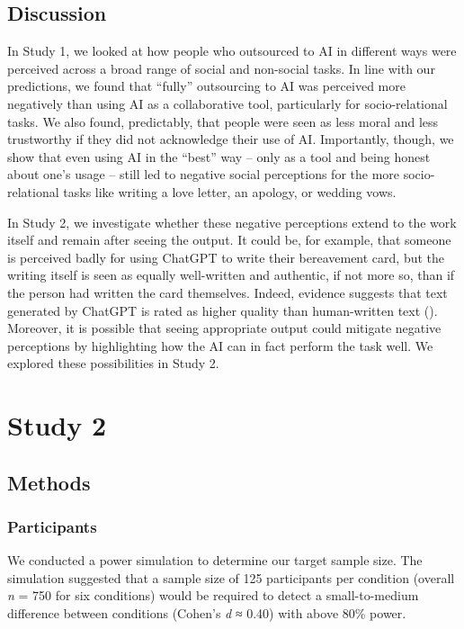 \documentclass[
  man,
  floatsintext,
  longtable,
  nolmodern,
  notxfonts,
  notimes,
  colorlinks=true,linkcolor=blue,citecolor=blue,urlcolor=blue]{apa7}
\begin{document}
\subsection*{Discussion}\label{discussion}

In Study 1, we looked at how people who outsourced to AI in different
ways were perceived across a broad range of social and non-social tasks.
In line with our predictions, we found that ``fully'' outsourcing to AI
was perceived more negatively than using AI as a collaborative tool,
particularly for socio-relational tasks. We also found, predictably,
that people were seen as less moral and less trustworthy if they did not
acknowledge their use of AI. Importantly, though, we show that even
using AI in the ``best'' way -- only as a tool and being honest about
one's usage -- still led to negative social perceptions for the more
socio-relational tasks like writing a love letter, an apology, or
wedding vows.

In Study 2, we investigate whether these negative perceptions extend to
the work itself and remain after seeing the output. It could be, for
example, that someone is perceived badly for using ChatGPT to write
their bereavement card, but the writing itself is seen as equally
well-written and authentic, if not more so, than if the person had
written the card themselves. Indeed, evidence suggests that text
generated by ChatGPT is rated as higher quality than human-written text
(). Moreover, it is possible
that seeing appropriate output could mitigate negative perceptions by
highlighting how the AI can in fact perform the task well. We explored
these possibilities in Study 2.

\section*{Study 2}\label{study-2}

\subsection*{Methods}\label{methods-1}

\subsubsection*{Participants}\label{participants-1}

We conducted a power simulation to determine our target sample size. The
simulation suggested that a sample size of 125 participants per
condition (overall \emph{n} = 750 for six conditions) would be required
to detect a small-to-medium difference between conditions (Cohen's
\emph{d} ≈ 0.40) with above 80\% power.
\end{document}
